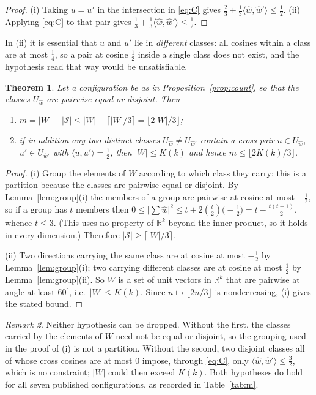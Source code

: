 \documentclass[11pt]{amsart}
\newtheorem{theorem}{Theorem}
\theoremstyle{remark}
\newtheorem{remark}[theorem]{Remark}
\newcommand{\ip}[2]{\langle #1,#2\rangle}
\newcommand{\wh}{\widehat{w}}
\begin{document}
\begin{proof}
(i) Taking $u=u'$ in the intersection in \eqref{eq:C} gives
$\tfrac23+\tfrac13\ip{\wh}{\wh{}'}\le\tfrac12$.
(ii) Applying \eqref{eq:C} to that pair gives
$\tfrac13+\tfrac13\ip{\wh}{\wh{}'}\le\tfrac12$.
\end{proof}

In (ii) it is essential that $u$ and $u'$ lie in \emph{different} classes: all
cosines within a class are at most $\tfrac14$, so a pair at cosine $\tfrac12$
inside a single class does not exist, and the hypothesis read that way would be
unsatisfiable.

\begin{theorem}\label{thm:bound}
Let a configuration be as in Proposition~\ref{prop:count}, so that the classes
$U_{\wh}$ are pairwise equal or disjoint. Then
\begin{enumerate}
\item $m=|W|-|\mathcal S|\le|W|-\lceil |W|/3\rceil=\lfloor 2|W|/3\rfloor$;
\item if in addition any two \emph{distinct} classes $U_{\wh}\ne U_{\wh'}$
      contain a cross pair $u\in U_{\wh}$, $u'\in U_{\wh'}$ with
      $\ip{u}{u'}=\tfrac12$, then $|W|\le K(k)$ and hence
      $m\le\lfloor 2K(k)/3\rfloor$.
\end{enumerate}
\end{theorem}

\begin{proof}
(i) Group the elements of $W$ according to which class they carry; this is a
partition because the classes are pairwise equal or disjoint. By
Lemma~\ref{lem:group}(i) the members of a group are pairwise at cosine at most
$-\tfrac12$, so if a group has $t$ members then
$0\le\bigl|\sum \wh\bigr|^{2}\le t+2\binom{t}{2}\bigl(-\tfrac12\bigr)
 =t-\tfrac{t(t-1)}{2}$,
whence $t\le3$. (This uses no property of $\mathbb{R}^{k}$ beyond the inner
product, so it holds in every dimension.) Therefore
$|\mathcal S|\ge\lceil |W|/3\rceil$.

(ii) Two directions carrying the same class are at cosine at most $-\tfrac12$
by Lemma~\ref{lem:group}(i); two carrying different classes are at cosine at
most $\tfrac12$ by Lemma~\ref{lem:group}(ii). So $W$ is a set of unit vectors
in $\mathbb{R}^{k}$ that are pairwise at angle at least $60^\circ$, i.e.\
$|W|\le K(k)$. Since $n\mapsto\lfloor 2n/3\rfloor$ is nondecreasing, (i) gives
the stated bound.
\end{proof}

\begin{remark}\label{rem:hyp}
Neither hypothesis can be dropped. Without the first, the classes carried by the
elements of $W$ need not be equal or disjoint, so the grouping used in the
proof of (i) is not a partition. Without the second, two disjoint classes all of
whose cross cosines are at most $0$ impose, through \eqref{eq:C}, only
$\ip{\wh}{\wh{}'}\le\tfrac32$, which is no constraint; $|W|$ could then exceed
$K(k)$. Both hypotheses do hold for all seven published configurations, as
recorded in Table~\ref{tab:m}.
\end{remark}
\end{document}
